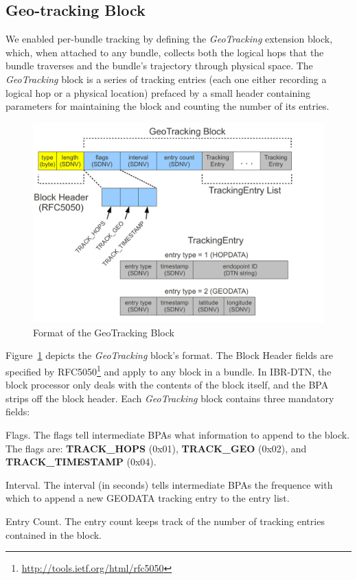 \subsection{Geo-tracking Block}
We enabled per-bundle tracking by defining the {\em GeoTracking} extension block, which, when attached to any bundle, collects both the logical hops that the bundle traverses and the bundle's trajectory through physical space. The {\em GeoTracking} block is a series of tracking entries (each one either recording a logical hop or a physical location) prefaced by a small header containing parameters for maintaining the block and counting the number of its entries.
\begin{figure}
\begin{center}
\includegraphics[width=\columnwidth]{figures/tracking-block.pdf}
\end{center}
\caption{Format of the GeoTracking Block}
\label{fig:tracking-block}
\end{figure}

\begin{sloppypar}
Figure~\ref{fig:tracking-block} depicts the {\em GeoTracking} block's format. The Block Header fields are specified by RFC5050\footnote{\url{http://tools.ietf.org/html/rfc5050}} and apply to any block in a bundle. In IBR-DTN, the block processor only deals with the contents of the block itself, and the BPA strips off the block header. Each {\em GeoTracking} block contains three mandatory fields:
\begin{description*}
  \item[Flags.] The flags tell intermediate BPAs what information to append to the block. The flags are: {\bf TRACK\_HOPS} (0x01), {\bf TRACK\_GEO} (0x02), and {\bf TRACK\_TIMESTAMP} (0x04).
  \item[Interval.] The interval (in seconds) tells intermediate BPAs the frequence with which to append a new GEODATA tracking entry to the entry list.  
  \item[Entry Count.] The entry count keeps track of the number of tracking entries contained in the block.
\end{description*}
\end{sloppypar}


